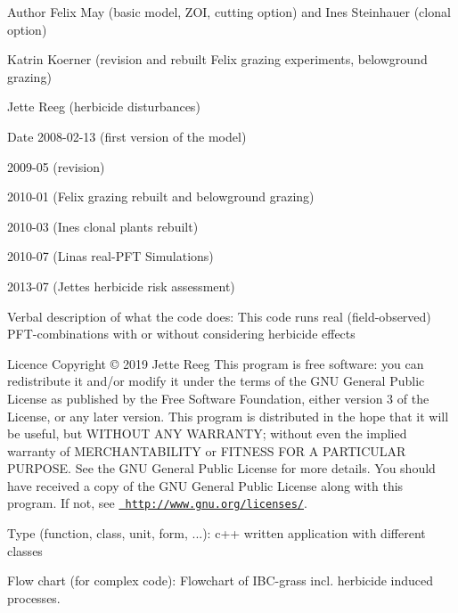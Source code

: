 \begin{DoxyAuthor}{Author}
Felix May (basic model, Z\+OI, cutting option) and Ines Steinhauer (clonal option) 

Katrin Koerner (revision and rebuilt Felix\textquotesingle{} grazing experiments, belowground grazing) 

Jette Reeg (herbicide disturbances)
\end{DoxyAuthor}
\begin{DoxyDate}{Date}
2008-\/02-\/13 (first version of the model) 

2009-\/05 (revision) 

2010-\/01 (Felix\textquotesingle{} grazing rebuilt and belowground grazing) 

2010-\/03 (Ines\textquotesingle{} clonal plants\textquotesingle{} rebuilt) 

2010-\/07 (Lina\textquotesingle{}s real-\/\+P\+FT Simulations) 

2013-\/07 (Jette\textquotesingle{}s herbicide risk assessment)
\end{DoxyDate}
\begin{DoxyParagraph}{Verbal description of what the code does\+:}
This code runs real (field-\/observed) P\+F\+T-\/combinations with or without considering herbicide effects
\end{DoxyParagraph}
\begin{DoxyParagraph}{Licence}
Copyright © 2019 Jette Reeg This program is free software\+: you can redistribute it and/or modify it under the terms of the G\+NU General Public License as published by the Free Software Foundation, either version 3 of the License, or any later version. This program is distributed in the hope that it will be useful, but W\+I\+T\+H\+O\+UT A\+NY W\+A\+R\+R\+A\+N\+TY; without even the implied warranty of M\+E\+R\+C\+H\+A\+N\+T\+A\+B\+I\+L\+I\+TY or F\+I\+T\+N\+E\+SS F\+OR A P\+A\+R\+T\+I\+C\+U\+L\+AR P\+U\+R\+P\+O\+SE. See the G\+NU General Public License for more details. You should have received a copy of the G\+NU General Public License along with this program. If not, see \href{http://www.gnu.org/licenses/}{\texttt{ http\+://www.\+gnu.\+org/licenses/}}.
\end{DoxyParagraph}
\begin{DoxyParagraph}{Type (function, class, unit, form, ...)\+:}
c++ written application with different classes
\end{DoxyParagraph}
\begin{DoxyParagraph}{Flow chart (for complex code)\+:}
Flowchart of I\+B\+C-\/grass incl. herbicide induced processes.
\end{DoxyParagraph}
